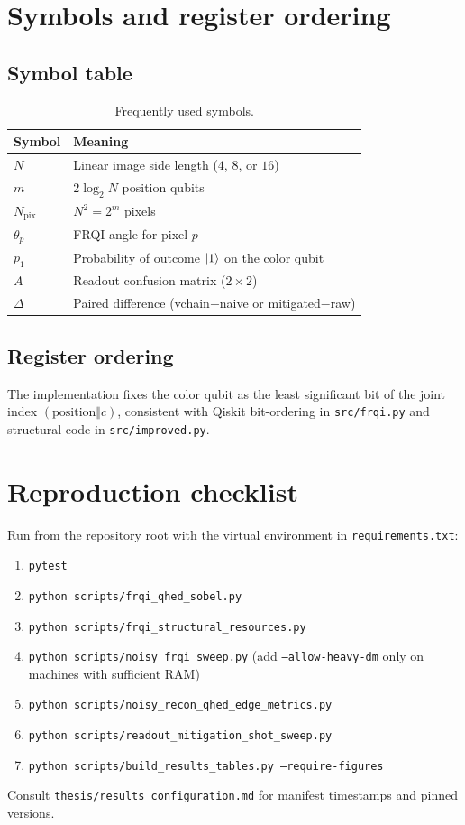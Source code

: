 \chapter{Symbols and register ordering}

\section{Symbol table}
\begin{table}[htbp]
\centering
\caption{Frequently used symbols.}
\begin{tabular}{ll}
\toprule
Symbol & Meaning \\
\midrule
$N$ & Linear image side length ($4$, $8$, or $16$) \\
$m$ & $2\log_2 N$ position qubits \\
$N_{\mathrm{pix}}$ & $N^2=2^m$ pixels \\
$\theta_p$ & FRQI angle for pixel $p$ \\
$p_1$ & Probability of outcome $\ket{1}$ on the color qubit \\
$A$ & Readout confusion matrix ($2\times 2$) \\
$\Delta$ & Paired difference (vchain$-$naive or mitigated$-$raw) \\
\bottomrule
\end{tabular}
\end{table}

\section{Register ordering}
The implementation fixes the color qubit as the least significant bit of the joint index $(\mathrm{position}\Vert c)$, consistent with Qiskit bit-ordering in \texttt{src/frqi.py} and structural code in \texttt{src/improved.py}.

\chapter{Reproduction checklist}

Run from the repository root with the virtual environment in \texttt{requirements.txt}:
\begin{enumerate}
  \item \texttt{pytest}
  \item \texttt{python scripts/frqi\_qhed\_sobel.py}
  \item \texttt{python scripts/frqi\_structural\_resources.py}
  \item \texttt{python scripts/noisy\_frqi\_sweep.py} (add \texttt{--allow-heavy-dm} only on machines with sufficient RAM)
  \item \texttt{python scripts/noisy\_recon\_qhed\_edge\_metrics.py}
  \item \texttt{python scripts/readout\_mitigation\_shot\_sweep.py}
  \item \texttt{python scripts/build\_results\_tables.py --require-figures}
\end{enumerate}
Consult \texttt{thesis/results\_configuration.md} for manifest timestamps and pinned versions.

